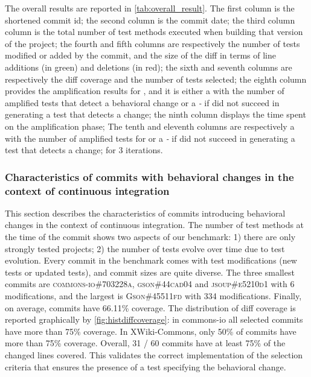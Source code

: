 The overall results are reported in \autoref{tab:overall_result}.
The first column is the shortened commit id;
the second column is the commit date;
the third column column is the total number of test methods executed when building that version of the project;
the fourth and fifth columns are respectively the number of tests modified or added by the commit, and the size of the diff in terms of line additions (in green) and deletions (in red);
the sixth and seventh columns are respectively the diff coverage and the number of tests \DCI selected;
the eighth column provides the amplification results for \DCIA, and it is either a \cmark with the number of amplified tests that detect a behavioral change or a \textit{-} if \DCI did not succeed in generating a test that detects a change;
the ninth column displays the time spent on the amplification phase;
The tenth and eleventh columns are respectively a \cmark with the number of amplified tests for \DCII or a \textit{-} if \DCI did not succeed in generating a test that detects a change; for 3 iterations.

\subsubsection{Characteristics of commits with behavioral changes in the context of continuous integration}
\label{subsubsec:dci:evaluation:characteristics}

This section describes the characteristics of commits introducing behavioral changes in the context of continuous integration.
The number of test methods at the time of the commit shows two aspects of our benchmark:
1) there are only strongly tested projects;
2) the number of tests evolve over time due to test evolution.
Every commit in the benchmark comes with test modifications (new tests or updated tests), and commit sizes are quite diverse.
The three smallest commits are \textsc{commons-io\#703228a}, \textsc{gson\#44cad04} and \textsc{jsoup\#e5210d1} with 6 modifications, and the largest is \textsc{Gson\#45511fd} with 334 modifications.
%
Finally, on average, commits have 66.11\% coverage.
The distribution of diff coverage is reported graphically by \autoref{fig:histdiffcoverage}: 
in commons-io all selected commits have more than 75\% coverage.
In XWiki-Commons, only 50\% of commits have more than 75\% coverage. 
Overall, 31 / 60 commits have at least 75\% of the changed lines covered.
This validates the correct implementation of the selection criteria that ensures the presence of a test specifying the behavioral change.

